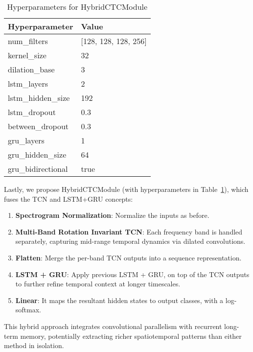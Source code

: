\begin{table}
    \caption{Hyperparameters for HybridCTCModule}
    \label{tab:hybrid_ctc}
    \centering
    \begin{tabular}{ll}
      \toprule
      \textbf{Hyperparameter} & \textbf{Value} \\
      \midrule
      num\_filters & [128, 128, 128, 256] \\
      kernel\_size & 32 \\
      dilation\_base & 3 \\
      lstm\_layers & 2 \\
      lstm\_hidden\_size & 192 \\
      lstm\_dropout & 0.3 \\
      between\_dropout & 0.3 \\
      gru\_layers & 1 \\
      gru\_hidden\_size & 64 \\
      gru\_bidirectional & true \\
      \bottomrule
    \end{tabular}
    \label{tab:hybrid_hyperparameters}
\end{table}

Lastly, we propose HybridCTCModule (with hyperparameters in Table~\ref{tab:hybrid_hyperparameters}), which fuses the TCN and LSTM+GRU concepts:

\begin{enumerate}
    \item\textbf{Spectrogram Normalization}: Normalize the inputs as before.

    \item\textbf{Multi-Band Rotation Invariant TCN}: Each frequency band is handled separately, capturing mid-range temporal dynamics via dilated convolutions.

    \item\textbf{Flatten}: Merge the per-band TCN outputs into a sequence representation.

    \item\textbf{LSTM + GRU}: Apply previous LSTM + GRU, on top of the TCN outputs to further refine temporal context at longer timescales.

    \item\textbf{Linear}: It maps the resultant hidden states to output classes, with a log-softmax.
\end{enumerate}

This hybrid approach integrates convolutional parallelism with recurrent long-term memory, potentially extracting richer spatiotemporal patterns than either method in isolation.
